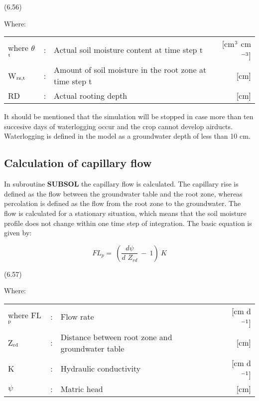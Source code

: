  
\strut\hfill (6.56)\\
\strut\hfill 
Where:\\
\begin{tabularx}{\textwidth}{llXr}



where $\theta$$_{{\rm t}}$ &:& Actual soil moisture content at time step t  & [cm$^{{\rm 3}}$ cm$^{{\rm -3}}$]\\
W$_{{\rm rz,t}}$ &:& Amount of soil moisture in the root zone at time step t  & [cm]\\
RD &:& Actual rooting depth  & [cm]
\end{tabularx}



It should be mentioned that the simulation will be stopped in case more than ten succesive
days of waterlogging occur and the crop cannot develop airducts. Waterlogging is defined
in the model as a groundwater depth of less than 10 cm.
\newpage

\subsection{Calculation of capillary flow  }

In subroutine {\bf SUBSOL} the capillary flow is calculated. The capillary rise is defined as
the flow between the groundwater table and the root zone, whereas  percolation is defined
as the flow from the root zone to the groundwater. The flow is calculated for a stationary
situation, which means that the soil moisture profile does not change within one time step
of integration. The basic equation is given by:

\begin{equation}
FL _{p} =~({\frac{d \psi }{ d\,\, Z _{rd} }} ~-~ 1)~K
\end{equation}

 
\strut\hfill (6.57)

Where:\\
\begin{tabularx}{\textwidth}{llXr}



where FL$_{{\rm p}}$ &:& Flow rate  & [cm d$^{{\rm -1}}$]\\
Z$_{{\rm rd}}$ &:& Distance between root zone and groundwater table  & [cm]\\
K &:& Hydraulic conductivity  & [cm d$^{{\rm -1}}$]\\
$\psi$ &:& Matric head  & [cm]
\end{tabularx}


